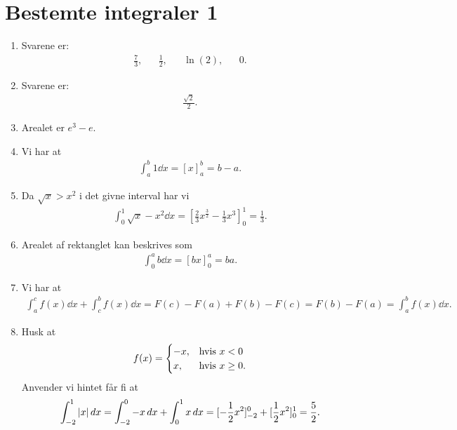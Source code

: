 \newpage
\section{Bestemte integraler 1}
\begin{enumerate}
	\item Svarene er:
	\begin{align*}
	\frac{7}{3},&&\frac{1}{2}, && \ln(2),&&0.
	\end{align*}
	
	\item Svarene er:
	\begin{align*}
	\frac{\sqrt{2}}{2}.
	\end{align*}
	
	\item Arealet er $e^3-e$.
	
	\item Vi har at 
	\begin{align*}
	\int_a^b 1\dd x=[x]_a^b=b-a.
	\end{align*}
	
	\item Da $\sqrt{x}>x^2$ i det givne interval har vi
	\begin{align*}
	\int_0^1 \sqrt{x}-x^2\dd x=[\frac{2}{3}x^{\frac{3}{2}}-\frac{1}{3}x^3]_0^1=\frac{1}{3}.
	\end{align*}
	
	\item Arealet af rektanglet kan beskrives som
	\begin{align*}
	\int_0^a b\dd x=[bx]_0^a=ba.
	\end{align*}
	
	\item \label{it:best2ans} Vi har at
	\begin{align*}
	\int_a^c f(x)\dd x+\int_c^b f(x)\dd x=F(c)-F(a)+F(b)-F(c)=F(b)-F(a)=\int_a^b f(x)\dd x.
	\end{align*}
	
	\item Husk at 
	\begin{align*}
	f(x)=\begin{cases}
	-x,& \textup{hvis }x<0\\
	x,& \textup{hvis }x\geq 0.
	\end{cases}
	\end{align*}
	Anvender vi hintet får fi at
\begin{align*}
	\int_{-2}^1 \vert x\vert\,d x=\int_{-2}^0-x\,d x+\int_0^1 x\,d x=[-\frac{1}{2}x^2]_{-2}^0+[\frac{1}{2}x^2]_0^1=\frac{5}{2}.
\end{align*}
	


\end{enumerate}

